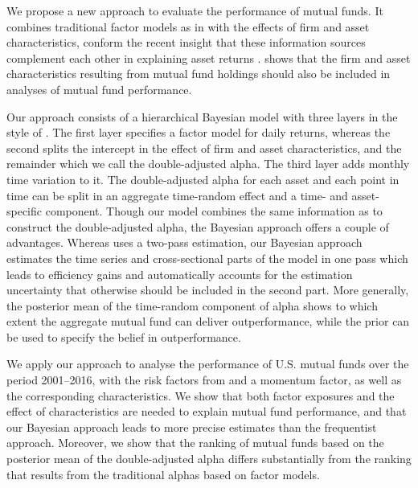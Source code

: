 We propose a new approach to evaluate the performance of mutual funds. It combines traditional factor models as in \citet{carhart1997persistence,fama1993common} with the effects of firm and asset characteristics, conform the recent insight that these information sources complement each other in explaining asset returns \citep{avramov2006asset,brennan1998alternative,chordia2015cross}. \citet{busse2017double} shows that the firm and asset characteristics resulting from mutual fund holdings should also be included in analyses of mutual fund performance.    

Our approach consists of a hierarchical Bayesian model with three layers in the style of \citet{cederburg2015asset}. The first layer specifies a factor model for daily returns, whereas the second splits the intercept in the effect of firm and asset characteristics, and the remainder which we call the double-adjusted alpha. The third layer adds monthly time variation to it. The double-adjusted alpha for each asset and each point in time can be split in an aggregate time-random effect and a time- and asset-specific component. Though our model combines the same information as \citet{busse2017double} to construct the double-adjusted alpha, the Bayesian approach offers a couple of advantages. Whereas \citet{busse2017double} uses a two-pass estimation, our Bayesian approach estimates the time series and cross-sectional parts of the model in one pass which leads to efficiency gains and  automatically accounts for the estimation uncertainty that otherwise should be included in the second part. More generally, the posterior mean of the time-random component of alpha shows to which extent the aggregate mutual fund can deliver outperformance, while the prior can be used to specify the belief in outperformance. 

We apply our approach to analyse the performance of U.S. mutual funds over the period 2001--2016, with the risk factors from \citet{FAMA20151} and a momentum factor, as well as the corresponding characteristics. We show that both factor exposures and the effect of characteristics are needed to explain mutual fund performance, and that our Bayesian approach leads to more precise estimates than the frequentist approach. Moreover, we show that the ranking of mutual funds based on the posterior mean of the double-adjusted alpha differs substantially from the ranking that results from the traditional alphas based on factor models.

